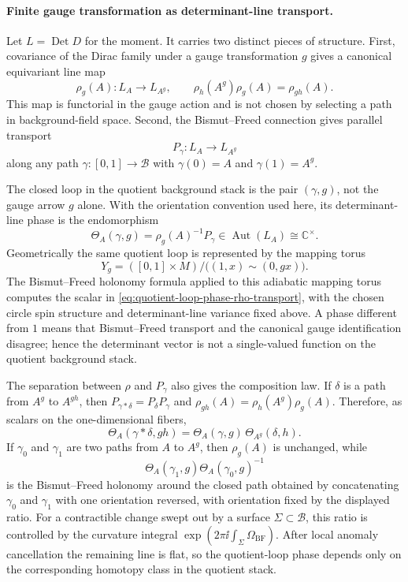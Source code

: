 \paragraph{Finite gauge transformation as determinant-line transport.}
Let \(L=\operatorname{Det}D\) for the moment.  It carries two distinct pieces
of structure.  First, covariance of the Dirac family under a gauge
transformation \(g\) gives a canonical equivariant line map
\[
  \rho_g(A):L_A\longrightarrow L_{A^g},
  \qquad
  \rho_h(A^g)\rho_g(A)=\rho_{gh}(A).
\]
This map is functorial in the gauge action and is not chosen by selecting a
path in background-field space.  Second, the Bismut--Freed connection gives
parallel transport
\[
  P_\gamma:L_A\longrightarrow L_{A^g}
\]
along any path \(\gamma:[0,1]\to\mathcal B\) with
\(\gamma(0)=A\) and \(\gamma(1)=A^g\).

The closed loop in the quotient background stack is the pair
\((\gamma,g)\), not the gauge arrow \(g\) alone.  With the orientation
convention used here, its determinant-line phase is the endomorphism
\begin{equation}
  \Theta_A(\gamma,g)
  =
  \rho_g(A)^{-1}P_\gamma
  \in\operatorname{Aut}(L_A)\cong\mathbb C^\times .
  \label{eq:quotient-loop-phase-rho-transport}
\end{equation}
Geometrically the same quotient loop is represented by the mapping torus
\begin{equation}
  Y_g
  =
  ([0,1]\times M)/\bigl((1,x)\sim(0,gx)\bigr).
  \label{eq:gauge-mapping-torus}
\end{equation}
The Bismut--Freed holonomy formula applied to this adiabatic mapping torus
computes the scalar in \eqref{eq:quotient-loop-phase-rho-transport}, with the
chosen circle spin structure and determinant-line variance fixed above.  A
phase different from \(1\) means that Bismut--Freed transport and the
canonical gauge identification disagree; hence the determinant vector is not
a single-valued function on the quotient background stack.

The separation between \(\rho\) and \(P_\gamma\) also gives the composition
law.  If \(\delta\) is a path from \(A^g\) to \(A^{gh}\), then
\(P_{\gamma*\delta}=P_\delta P_\gamma\) and
\(\rho_{gh}(A)=\rho_h(A^g)\rho_g(A)\).  Therefore, as scalars on the
one-dimensional fibers,
\begin{equation}
  \Theta_A(\gamma*\delta,gh)
  =
  \Theta_A(\gamma,g)\,
  \Theta_{A^g}(\delta,h).
  \label{eq:quotient-loop-phase-composition}
\end{equation}
If \(\gamma_0\) and \(\gamma_1\) are two paths from \(A\) to \(A^g\), then
\(\rho_g(A)\) is unchanged, while
\[
  \Theta_A(\gamma_1,g)\Theta_A(\gamma_0,g)^{-1}
\]
is the Bismut--Freed holonomy around the closed path obtained by concatenating
\(\gamma_0\) and \(\gamma_1\) with one orientation reversed, with orientation
fixed by the displayed ratio.  For a contractible change swept out by a
surface \(\Sigma\subset\mathcal B\), this ratio is controlled by the curvature
integral
\(\exp(2\pi\ii\int_\Sigma\Omega_{\mathrm{BF}})\).  After local anomaly
cancellation the remaining line is flat, so the quotient-loop phase depends
only on the corresponding homotopy class in the quotient stack.

